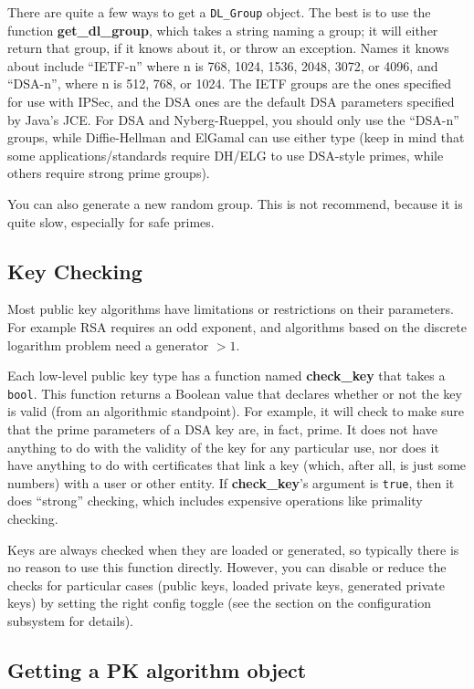 \documentclass{article}
\newcommand{\function}[1]{\textbf{#1}}
\newcommand{\type}[1]{\texttt{#1}}
\begin{document}
There are quite a few ways to get a \type{DL\_Group} object. The best is to use
the function \function{get\_dl\_group}, which takes a string naming a group; it
will either return that group, if it knows about it, or throw an
exception. Names it knows about include ``IETF-n'' where n is 768, 1024, 1536,
2048, 3072, or 4096, and ``DSA-n'', where n is 512, 768, or 1024. The IETF
groups are the ones specified for use with IPSec, and the DSA ones are the
default DSA parameters specified by Java's JCE. For DSA and Nyberg-Rueppel, you
should only use the ``DSA-n'' groups, while Diffie-Hellman and ElGamal can use
either type (keep in mind that some applications/standards require DH/ELG to
use DSA-style primes, while others require strong prime groups).

You can also generate a new random group. This is not recommend, because it is
quite slow, especially for safe primes.

\subsection{Key Checking}

Most public key algorithms have limitations or restrictions on their
parameters. For example RSA requires an odd exponent, and algorithms based on
the discrete logarithm problem need a generator $> 1$.

Each low-level public key type has a function named \function{check\_key} that
takes a \type{bool}. This function returns a Boolean value that declares
whether or not the key is valid (from an algorithmic standpoint). For example,
it will check to make sure that the prime parameters of a DSA key are, in fact,
prime. It does not have anything to do with the validity of the key for any
particular use, nor does it have anything to do with certificates that link a
key (which, after all, is just some numbers) with a user or other entity. If
\function{check\_key}'s argument is \type{true}, then it does ``strong''
checking, which includes expensive operations like primality checking.

Keys are always checked when they are loaded or generated, so typically there
is no reason to use this function directly. However, you can disable or reduce
the checks for particular cases (public keys, loaded private keys, generated
private keys) by setting the right config toggle (see the section on the
configuration subsystem for details).

\subsection{Getting a PK algorithm object}
\end{document}
